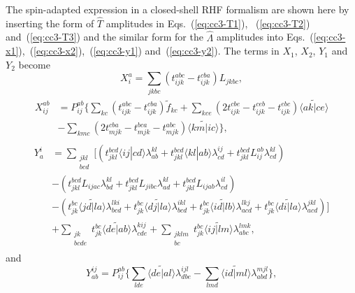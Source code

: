 The spin-adapted expression in a closed-shell RHF formalism are shown here by inserting the form of $\hat{T}$  amplitudes in Eqs.~(\ref{eq:cc3-T1}), ~(\ref{eq:cc3-T2}) and~(\ref{eq:cc3-T3}) and the similar form for the $\hat{\Lambda}$ amplitudes into Eqs.~(\ref{eq:cc3-x1}),~(\ref{eq:cc3-x2}),~(\ref{eq:cc3-y1}) and~(\ref{eq:cc3-y2}). The terms in $X_{1}$, $X_{2}$, $Y_{1}$ and $Y_{2}$ become
\begin{equation}
X_{i}^{a}= \sum_{jkbc}(t_{ijk}^{abc}-t_{ijk}^{cba})L_{jkbc},
\label{eq:cc3-x1-exp}
\end{equation}
\begin{align}
\begin{split}
X_{ij}^{ab}&=P_{ij}^{ab}\{\sum_{kc}(t_{ijk}^{abc}-t_{ijk}^{cba})\tilde{f}_{kc} + \sum_{kce}(2t_{ijk}^{cbe}-t_{ijk}^{ceb}-t_{ijk}^{ebc}) \tilde{\langle ak|ce \rangle} \\
 &- \sum_{kmc}(2t_{mjk}^{cba}-t_{mjk}^{bca}-t_{mjk}^{abc}) \tilde{\langle km|ic \rangle} \},
\label{eq:cc3-x2-exp}
\end{split}
\end{align}
\begin{align}
\begin{split}
Y_{a}^{i} &= \sum\limits_{\substack{jkl\\bcd}}[(t_{jkl}^{bcd}\langle ij|cd \rangle \lambda_{ab}^{kl} + t_{jkl}^{bcd} \langle kl|ab \rangle \lambda_{cd}^{ij}+ t_{jkl}^{bcd}L_{ij}^{ab}\lambda_{cd}^{kl}) \\
 &-(t_{jkl}^{bcd}L_{ijac}\lambda_{bd}^{kl} + t_{jkl}^{bcd}L_{jibc}\lambda_{ad}^{kl} + t_{jkl}^{bcd}L_{ijab}\lambda_{cd}^{il})\\
 &-(t_{jk}^{bc} \tilde{\langle jd|la \rangle} \lambda_{bcd}^{lki} + t_{jk}^{bc} \tilde{\langle dj|la \rangle} \lambda_{bcd}^{ikl} 
   + t_{jk}^{bc} \tilde{\langle id|lb \rangle} \lambda_{acd}^{lkj} + t_{jk}^{bc} \tilde{\langle di|la \rangle} \lambda_{acd}^{jkl})] \\
 &+\sum\limits_{\substack{jk\\bcde}} t_{jk}^{bc} \tilde{\langle de|ab \rangle} \lambda_{cde}^{kij}
   +\sum\limits_{\substack{jklm\\bc}}t_{jk}^{bc} \tilde{\langle ij|lm \rangle} \lambda_{abc}^{lmk},
\label{eq:cc3-y1-exp}
\end{split}
\end{align}
and
\begin{equation}
Y_{ab}^{ij}= P_{ij}^{ab} \{ \sum_{lde} \tilde{\langle de|al \rangle} \lambda_{dbe}^{ijl} -  \sum_{lmd} \tilde{\langle id|ml \rangle} \lambda_{abd}^{mjl} \},
\label{eq:cc3-y2-exp}
\end{equation}
